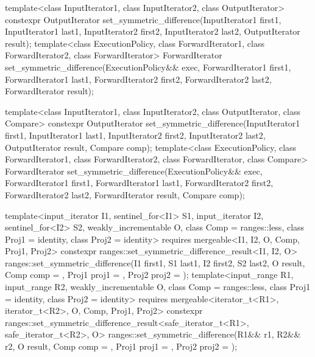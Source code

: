 %
\begin{itemdecl}
template<class InputIterator1, class InputIterator2,
         class OutputIterator>
  constexpr OutputIterator
    set_symmetric_difference(InputIterator1 first1, InputIterator1 last1,
                             InputIterator2 first2, InputIterator2 last2,
                             OutputIterator result);
template<class ExecutionPolicy, class ForwardIterator1, class ForwardIterator2,
         class ForwardIterator>
  ForwardIterator
    set_symmetric_difference(ExecutionPolicy&& exec,
                             ForwardIterator1 first1, ForwardIterator1 last1,
                             ForwardIterator2 first2, ForwardIterator2 last2,
                             ForwardIterator result);

template<class InputIterator1, class InputIterator2,
         class OutputIterator, class Compare>
  constexpr OutputIterator
    set_symmetric_difference(InputIterator1 first1, InputIterator1 last1,
                             InputIterator2 first2, InputIterator2 last2,
                             OutputIterator result, Compare comp);
template<class ExecutionPolicy, class ForwardIterator1, class ForwardIterator2,
         class ForwardIterator, class Compare>
  ForwardIterator
    set_symmetric_difference(ExecutionPolicy&& exec,
                             ForwardIterator1 first1, ForwardIterator1 last1,
                             ForwardIterator2 first2, ForwardIterator2 last2,
                             ForwardIterator result, Compare comp);

template<input_iterator I1, sentinel_for<I1> S1, input_iterator I2, sentinel_for<I2> S2,
         weakly_incrementable O, class Comp = ranges::less,
         class Proj1 = identity, class Proj2 = identity>
  requires mergeable<I1, I2, O, Comp, Proj1, Proj2>
  constexpr ranges::set_symmetric_difference_result<I1, I2, O>
    ranges::set_symmetric_difference(I1 first1, S1 last1, I2 first2, S2 last2, O result,
                                     Comp comp = {}, Proj1 proj1 = {},
                                     Proj2 proj2 = {});
template<input_range R1, input_range R2, weakly_incrementable O,
         class Comp = ranges::less, class Proj1 = identity, class Proj2 = identity>
  requires mergeable<iterator_t<R1>, iterator_t<R2>, O, Comp, Proj1, Proj2>
  constexpr ranges::set_symmetric_difference_result<safe_iterator_t<R1>, safe_iterator_t<R2>, O>
    ranges::set_symmetric_difference(R1&& r1, R2&& r2, O result, Comp comp = {},
                                     Proj1 proj1 = {}, Proj2 proj2 = {});
\end{itemdecl}

